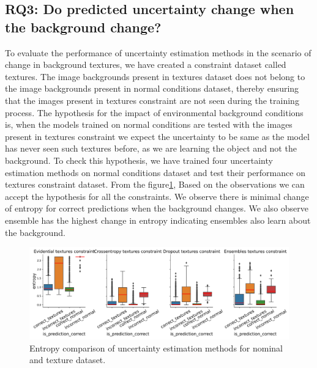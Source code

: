 \subsection{RQ3: Do predicted uncertainty change when the background change?}
To evaluate the performance of uncertainty estimation methods in the scenario of change in background textures, we have created a constraint dataset called textures. The image backgrounds present in textures dataset does not belong to the image backgrounds present in normal conditions dataset, thereby ensuring that the images present in textures constraint are not seen during the training process. The hypothesis for the impact of environmental background conditions is, when the models trained on normal conditions are tested with the images present in textures constraint we expect the uncertainty to be same as the model has never seen such textures before, as we are learning the object and not the background. To check this hypothesis, we have trained four uncertainty estimation methods on normal conditions dataset and test their performance on textures constraint dataset. From the figure\cref{fig:entropy_textures}, 
Based on the observations we can accept the hypothesis for all the constraints. We observe there is minimal change of entropy for correct predictions when the background changes.  We also observe ensemble has the highest change in entropy indicating ensembles also learn about the background.
 
\begin{figure}[t]
    \centering
    \includegraphics[width=\textwidth]{images/entropy_textures_constraint.png}
    \caption{Entropy comparison of uncertainty estimation methods for nominal and texture dataset.}
    \label{fig:entropy_textures}
\end{figure}

